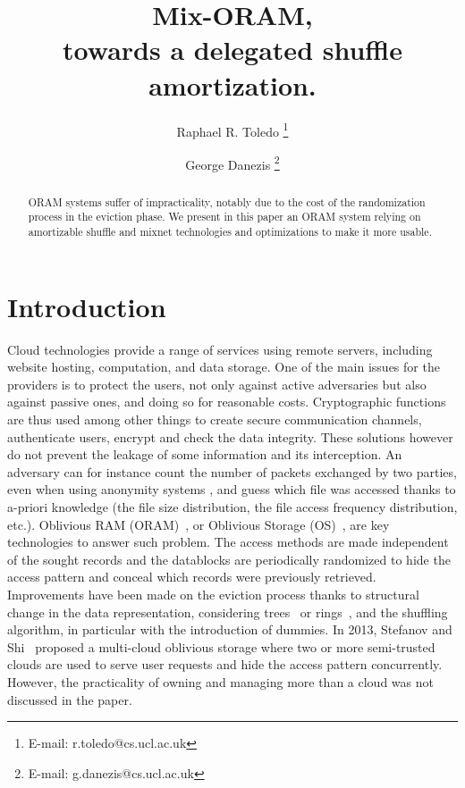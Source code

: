 \documentclass[conference]{IEEEtran}
\begin{document}
\author{Raphael R. Toledo \thanks{E-mail: r.toledo@cs.ucl.ac.uk} }
\author{George Danezis \thanks{E-mail: g.danezis@cs.ucl.ac.uk} }


\title{Mix-ORAM,\\ towards a delegated shuffle amortization.}

\maketitle

\begin{abstract}
{
ORAM systems suffer of impracticality, notably due to the cost of the randomization process in the eviction phase.
We present in this paper an ORAM system relying on amortizable shuffle and mixnet technologies and optimizations to make it more usable.
}
\end{abstract}

\section{Introduction}
Cloud technologies provide a range of services using remote servers, including website hosting, computation, and data storage. One of the main issues for the providers is to protect the users, not only against active adversaries but also against passive ones, and doing so for reasonable costs. 
Cryptographic functions are thus used among other things to create secure communication channels, authenticate users, encrypt and check the data integrity.
These solutions however do not prevent the leakage of some information and its interception. An adversary can for instance count the number of packets exchanged by two parties, even when using anonymity systems \cite{murdoch2005}, and guess which file was accessed thanks to a-priori knowledge (the file size distribution, the file access frequency distribution, etc.).
Oblivious RAM (ORAM)~\cite{goldreich87}, or Oblivious Storage (OS)~\cite{boneh2011}, are key technologies to answer such problem. The access methods are made independent of the sought records and the datablocks are periodically randomized to hide the access pattern and conceal which records were previously retrieved.\\

Improvements have been made on the eviction process thanks to structural change in the data representation, considering trees~\cite{} or rings~\cite{}, and the shuffling algorithm, in particular with the introduction of dummies.
In 2013, Stefanov and Shi~\cite{stefanov2013} proposed a multi-cloud oblivious storage where two or more semi-trusted clouds are used to serve user requests and hide the access pattern concurrently. However, the practicality of owning and managing more than a cloud was not discussed in the paper.\\
\end{document}
